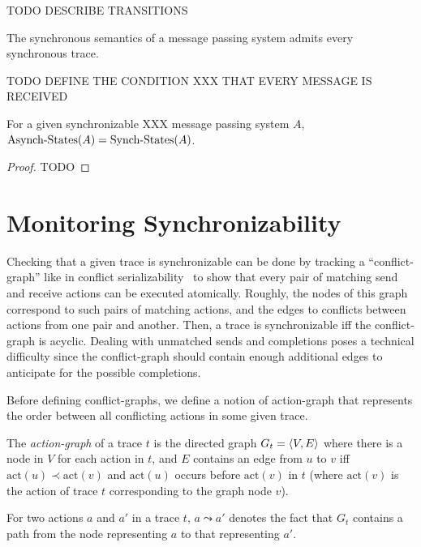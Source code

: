 TODO DESCRIBE TRANSITIONS 

\begin{lemma}\label{lem:sync_traces}
The synchronous semantics of a message passing system admits every synchronous trace.
\end{lemma}

TODO DEFINE THE CONDITION XXX THAT EVERY MESSAGE IS RECEIVED

\begin{lemma}
For a given synchronizable XXX message passing system $A$, $\mathrm{Asynch}\text{-}\mathrm{States}(A)=\mathrm{Synch}\text{-}\mathrm{States}(A)$.
\end{lemma}
\begin{proof}
TODO 
\end{proof}

\section{Monitoring Synchronizability}

Checking that a given trace is synchronizable can be done by tracking a ``conflict-graph'' like in conflict serializability~\cite{}
to show that every pair of matching send and receive actions can be executed atomically. Roughly, the nodes of this graph
correspond to such pairs of matching actions, and the edges to conflicts between actions from one pair and another. 
Then, a trace is synchronizable if{f} the conflict-graph is acyclic. Dealing with unmatched sends and completions 
poses a technical difficulty since the conflict-graph should contain enough additional edges
to anticipate for the possible completions. 

Before defining conflict-graphs, we define a notion of action-graph that represents the order between all conflicting actions in some given trace.

\begin{definition}\label{def:pr_graphs}
    The \emph{action-graph} of a trace $t$ is the directed graph 
    $G_t = \left\langle {V,E} \right\rangle$ where there is a node in $V$ for each action in $t$, and $E$ 
    contains an edge from $u$ to $v$ iff $\mathrm{act}(u) \prec \mathrm{act}(v)$ and $\mathrm{act}(u)$ occurs before $\mathrm{act}(v)$ in $t$ (where $\mathrm{act}(v)$ is the action of trace $t$ corresponding to the graph node $v$).
\end{definition}
For two actions $a$ and $a'$ in a trace $t$, $a\leadsto a'$ denotes the fact that $G_t$ contains a path from the node representing $a$ to that representing $a'$.

